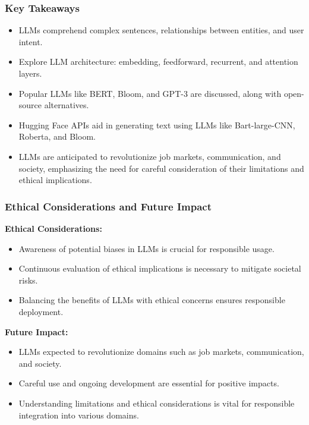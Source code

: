 \begin{frame}[fragile]\frametitle{Key Takeaways}

  \begin{itemize}
    \item LLMs comprehend complex sentences, relationships between entities, and user intent.
    \item Explore LLM architecture: embedding, feedforward, recurrent, and attention layers.
    \item Popular LLMs like BERT, Bloom, and GPT-3 are discussed, along with open-source alternatives.
    \item Hugging Face APIs aid in generating text using LLMs like Bart-large-CNN, Roberta, and Bloom.
    \item LLMs are anticipated to revolutionize job markets, communication, and society, emphasizing the need for careful consideration of their limitations and ethical implications.
  \end{itemize}
\end{frame}

\begin{frame}[fragile]
  \frametitle{Ethical Considerations and Future Impact}

  \textbf{Ethical Considerations:}
  \begin{itemize}
    \item Awareness of potential biases in LLMs is crucial for responsible usage.
    \item Continuous evaluation of ethical implications is necessary to mitigate societal risks.
    \item Balancing the benefits of LLMs with ethical concerns ensures responsible deployment.

  \end{itemize}

  \textbf{Future Impact:}
  \begin{itemize}
    \item LLMs expected to revolutionize domains such as job markets, communication, and society.
    \item Careful use and ongoing development are essential for positive impacts.
    \item Understanding limitations and ethical considerations is vital for responsible integration into various domains.
  \end{itemize}
\end{frame}

